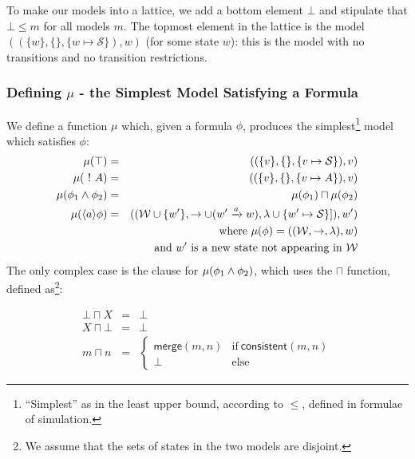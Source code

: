 To make our models into a lattice, we add a bottom element $\bot$ and stipulate that $\bot \leq m$ for all  models $m$.
The topmost element in the lattice is the  model $( (\{w\}, \{\}, \{w \mapsto \mathcal{S}\}), w)$ (for some state $w$): this is the model with no transitions and no transition restrictions.

\subsubsection{Defining $\mu$ - the Simplest  Model Satisfying a Formula}
We define a function $\mu$ which, given a formula $\phi$, produces the simplest\footnote{``Simplest'' as in the least upper bound, according to $\leq$, defined in formulae of simulation.} model which satisfies $\phi$:
\begin{eqnarray}
\mu (\top) & = & ( (\{v\}, \{\}, \{v \mapsto \mathcal{S}\}), v) \nonumber \\
\mu (\ ! \  A) & = & ( (\{v\}, \{\}, \{v \mapsto A\}), v) \nonumber \\
\mu (\phi_1 \land \phi_2) & = & \mu(\phi_1) \sqcap \mu(\phi_2) \nonumber \\
\mu (\langle a \rangle \phi) & = & ( (\mathcal{W} \cup \{w'\}, \rightarrow \cup (w' \xrightarrow{a} w), \lambda \cup \{w' \mapsto \mathcal{S}\}]), w') \nonumber \\
		& & \mbox{where }\mu(\phi) = ( (\mathcal{W}, \rightarrow, \lambda), w) \nonumber \\
		& & \mbox{and }w' \mbox{ is a new state not appearing in }\mathcal{W} \nonumber
\end{eqnarray}
The only complex case is the clause for $\mu (\phi_1 \land \phi_2)$, which uses the $\sqcap$ function, defined as\footnote{We assume that the sets of states in the two  models are disjoint.}:

\begin{eqnarray*}
  \bot \sqcap X 
     & = & 
  \bot \nonumber 
     \\
  X \sqcap \bot 
     & = & 
  \bot \nonumber 
     \\
  m \sqcap n 
     & = & 
  \begin{cases}
    \mathsf{merge}(m, n) & \text{if}\ \mathsf{consistent}(m, n) \\
    \bot & \text{else}
  \end{cases}
\end{eqnarray*}

